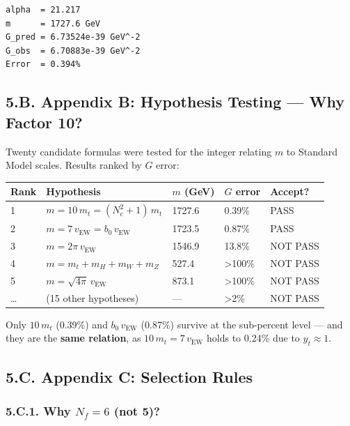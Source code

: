 \documentclass[
  11pt,
]{article}
\begin{document}
\begin{verbatim}
alpha  = 21.217
m      = 1727.6 GeV
G_pred = 6.73524e-39 GeV^-2
G_obs  = 6.70883e-39 GeV^-2
Error  = 0.394%
\end{verbatim}

\bigskip

\hypertarget{b.-appendix-b-hypothesis-testing-why-factor-10}{%
\subsection{5.B. Appendix B: Hypothesis Testing --- Why Factor
10?}\label{b.-appendix-b-hypothesis-testing-why-factor-10}}

Twenty candidate formulas were tested for the integer relating \(m\) to
Standard Model scales. Results ranked by \(G\) error:

\begin{longtable}[]{@{}lllll@{}}
\toprule
Rank & Hypothesis & \(m\) (GeV) & \(G\) error & Accept?\tabularnewline
\midrule
\endhead
1 & \(m = 10\,m_t = (N_c^2+1)\,m_t\) & 1727.6 & 0.39\% &
PASS\tabularnewline
2 & \(m = 7\,v_{\text{EW}} = b_0\,v_{\text{EW}}\) & 1723.5 & 0.87\% &
PASS\tabularnewline
3 & \(m = 2\pi\,v_{\text{EW}}\) & 1546.9 & 13.8\% & NOT
PASS\tabularnewline
4 & \(m = m_t + m_H + m_W + m_Z\) & 527.4 & \textgreater100\% & NOT
PASS\tabularnewline
5 & \(m = \sqrt{4\pi}\,v_{\text{EW}}\) & 873.1 & \textgreater100\% & NOT
PASS\tabularnewline
\ldots{} & (15 other hypotheses) & --- & \textgreater2\% & NOT
PASS\tabularnewline
\bottomrule
\end{longtable}

Only \(10\,m_t\) (0.39\%) and \(b_0\,v_{\text{EW}}\) (0.87\%) survive at
the sub-percent level --- and they are the \textbf{same relation}, as
\(10\,m_t = 7\,v_{\text{EW}}\) holds to 0.24\% due to \(y_t \approx 1\).

\bigskip

\hypertarget{c.-appendix-c-selection-rules}{%
\subsection{5.C. Appendix C: Selection
Rules}\label{c.-appendix-c-selection-rules}}

\hypertarget{c.1.-why-n_f-6-not-5}{%
\subsubsection{\texorpdfstring{5.C.1. Why \(N_f = 6\) (not
5)?}{5.C.1. Why N\_f = 6 (not 5)?}}\label{c.1.-why-n_f-6-not-5}}
\end{document}
